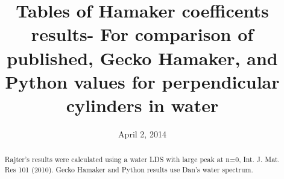 \documentclass[onecolumn,letterpaper,amsmath,amssymb,floatfix,aps,superscriptaddress]{revtex4}
\begin{document}
\title{\bf Tables of Hamaker coefficents results- For comparison of published, Gecko
Hamaker, and Python values for perpendicular cylinders in water}

\author{April 2, 2014}
    
\begin{abstract}
Rajter's results were calculated using a water LDS with large peak at n=0, Int.
J. Mat. Res 101 (2010).  Gecko Hamaker and Python results use Dan's water
spectrum.
\end{abstract}

\maketitle        
%
%
\end{document}
